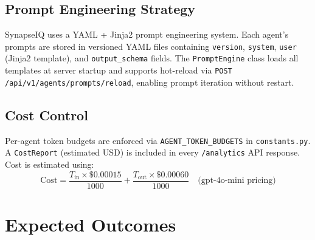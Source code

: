 \documentclass[12pt,letterpaper]{article}
\begin{document}
\subsection{Prompt Engineering Strategy}

SynapseIQ uses a YAML + Jinja2 prompt engineering system. Each agent's prompts are stored
in versioned YAML files containing \texttt{version}, \texttt{system}, \texttt{user}
(Jinja2 template), and \texttt{output\_schema} fields. The \texttt{PromptEngine} class
loads all templates at server startup and supports hot-reload via
\texttt{POST /api/v1/agents/prompts/reload}, enabling prompt iteration without restart.

\subsection{Cost Control}

Per-agent token budgets are enforced via \texttt{AGENT\_TOKEN\_BUDGETS} in
\texttt{constants.py}. A \texttt{CostReport} (estimated USD) is included in every
\texttt{/analytics} API response. Cost is estimated using:
\[
  \text{Cost} = \frac{T_\text{in} \times \$0.00015}{1000}
              + \frac{T_\text{out} \times \$0.00060}{1000}
  \quad \text{(gpt-4o-mini pricing)}
\]

\section{Expected Outcomes}
\end{document}
